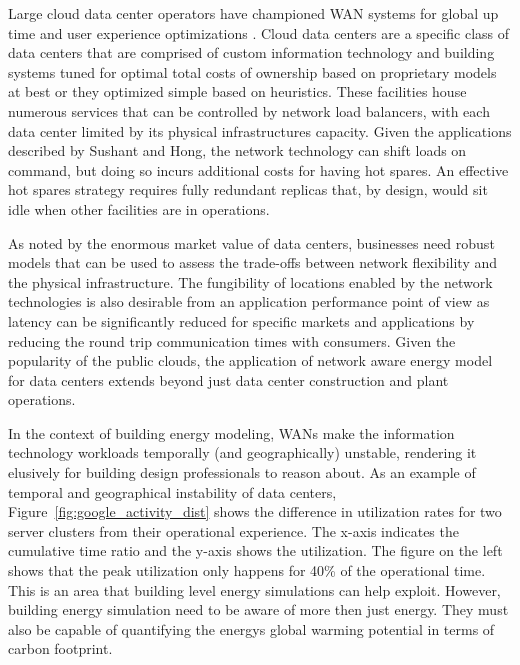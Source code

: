 Large cloud data center operators have championed WAN systems for global up time and user experience optimizations \cite{sushant13} \cite{hong13}. Cloud data centers are a specific class of data centers that are comprised of custom information technology and building systems tuned for optimal total costs of ownership based on proprietary models at best or they optimized simple based on heuristics. These facilities house numerous services that can be controlled by network load balancers, with each data center limited by its physical infrastructure\textsc{}s capacity. Given the applications described by Sushant and Hong, the network technology can shift loads on command, but doing so incurs additional costs for having hot spares. An effective hot spares strategy requires fully redundant replicas that, by design, would sit idle when other facilities are in operations. 

As noted by the enormous market value of data centers, businesses need robust models that can be used to assess the trade-offs between network flexibility and the physical infrastructure. The fungibility of locations enabled by the network technologies is also desirable from an application performance point of view as latency can be significantly reduced for specific markets and applications by reducing the round trip communication times with consumers. Given the popularity of the public clouds, the application of network aware energy model for data centers extends beyond just data center construction and plant operations.   

In the context of building energy modeling, WAN\textsc{}s make the information technology workloads temporally (and geographically) unstable, rendering it elusively for building design professionals to reason about. As an example of temporal and geographical instability of data centers, Figure~\ref{fig:google_activity_dist} \cite{barroso18} shows the difference in utilization rates for two server clusters from their operational experience. The x-axis indicates the cumulative time ratio and the y-axis shows the utilization. The figure on the left shows that the peak utilization only happens for 40\% of the operational time. This is an area that building level energy simulations can help exploit. However, building energy simulation need to be aware of more then just energy. They must also be capable of quantifying the energy\textsc{}s global warming potential in terms of carbon footprint.

